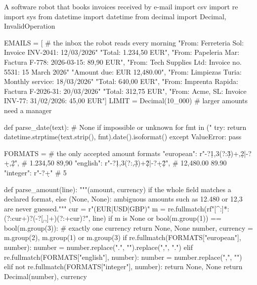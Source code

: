 \begin{pylisting}[label={lst:rpa}]{A software robot that books invoices received by e-mail}
import csv
import re
import sys
from datetime import datetime
from decimal import Decimal, InvalidOperation

EMAILS = [  # the inbox the robot reads every morning
    "From: Ferreteria Sol\nSubject: Invoice INV-2041\nDate: 12/03/2026\n"
    "Total: 1.234,50 EUR",
    "From: Papeleria Mar\nSubject: Factura F-778\nFecha: 2026-03-15\nImporte: 89,90 EUR",
    "From: Tech Supplies Ltd\nSubject: Invoice no. 5531\nDate: 15 March 2026\n"
    "Amount due: EUR 12,480.00",
    "From: Limpiezas Turia\nSubject: Monthly service\nDate: 18/03/2026\n"
    "Total: 640,00 EUR",
    "From: Imprenta Rapida\nSubject: Factura F-2026-31\nFecha: 20/03/2026\n"
    "Total: 312,75 EUR",
    "From: Acme, SL\nSubject: Invoice INV-77\nDate: 31/02/2026\nTotal: 45,00 EUR"]
LIMIT = Decimal(10_000)                            # larger amounts need a manager

def parse_date(text):                              # None if impossible or unknown
    for fmt in ("%
        try:
            return datetime.strptime(text.strip(), fmt).date().isoformat()
        except ValueError:
            pass

FORMATS = {                                        # the only accepted amount formats
    "european": r"-?\d{1,3}(?:\.\d{3})+,\d{2}|-?\d+,\d{2}",     # 1.234,50  89,90
    "english": r"-?\d{1,3}(?:,\d{3})+\.\d{2}|-?\d+\.\d{2}",    # 12,480.00  89.90
    "integer": r"-?\d+"}                                       # 5

def parse_amount(line):
    """(amount, currency) if the whole field matches a declared format, else (None, None):
    ambiguous amounts such as 12.480 or 12,3 are never guessed."""
    cur = r"(EUR|USD|GBP)"
    m = re.fullmatch(rf"[^:]*:\s*(?:{cur}\s+)?(-?[\d.,]+)(?:\s+{cur})?\s*", line)
    if m is None or bool(m.group(1)) == bool(m.group(3)):     # exactly one currency
        return None, None
    number, currency = m.group(2), m.group(1) or m.group(3)
    if re.fullmatch(FORMATS["european"], number):
        number = number.replace(".", "").replace(",", ".")
    elif re.fullmatch(FORMATS["english"], number):
        number = number.replace(",", "")
    elif not re.fullmatch(FORMATS["integer"], number):
        return None, None
    return Decimal(number), currency


\end{pylisting}
